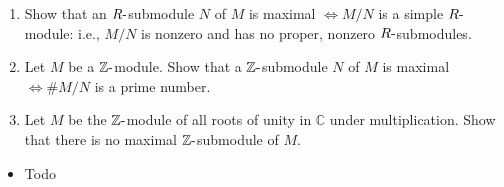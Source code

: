 \begin{enumerate}
\def\labelenumi{\alph{enumi}.}
\item
  Show that an \(R{\hbox{-}}\)submodule \(N\) of \(M\) is maximal
  \(\iff M /N\) is a simple \(R{\hbox{-}}\)module: i.e., \(M /N\) is
  nonzero and has no proper, nonzero \(R{\hbox{-}}\)submodules.
\item
  Let \(M\) be a \({\mathbb{Z}}{\hbox{-}}\)module. Show that a
  \({\mathbb{Z}}{\hbox{-}}\)submodule \(N\) of \(M\) is maximal
  \(\iff \#M /N\) is a prime number.
\item
  Let \(M\) be the \({\mathbb{Z}}{\hbox{-}}\)module of all roots of
  unity in \({\mathbb{C}}\) under multiplication. Show that there is no
  maximal \({\mathbb{Z}}{\hbox{-}}\)submodule of \(M\).
\end{enumerate}

\begin{concept}

\envlist

\begin{itemize}
\tightlist
\item
  Todo
\end{itemize}

\end{concept}

